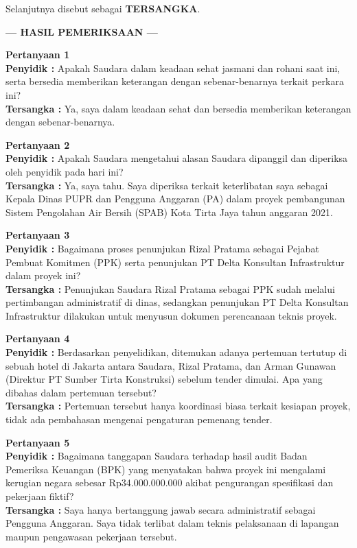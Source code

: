 \documentclass[12pt,a4paper]{article}
\begin{document}
Selanjutnya disebut sebagai \textbf{TERSANGKA}.

\vspace{0.3cm}
\begin{center}
    \textbf{--- HASIL PEMERIKSAAN ---}
\end{center}

\textbf{Pertanyaan 1} \\
\textbf{Penyidik :} Apakah Saudara dalam keadaan sehat jasmani dan rohani saat ini, serta bersedia memberikan keterangan dengan sebenar-benarnya terkait perkara ini? \\
\textbf{Tersangka :} Ya, saya dalam keadaan sehat dan bersedia memberikan keterangan dengan sebenar-benarnya.

\vspace{0.2cm}
\textbf{Pertanyaan 2} \\
\textbf{Penyidik :} Apakah Saudara mengetahui alasan Saudara dipanggil dan diperiksa oleh penyidik pada hari ini? \\
\textbf{Tersangka :} Ya, saya tahu. Saya diperiksa terkait keterlibatan saya sebagai Kepala Dinas PUPR dan Pengguna Anggaran (PA) dalam proyek pembangunan Sistem Pengolahan Air Bersih (SPAB) Kota Tirta Jaya tahun anggaran 2021.

\vspace{0.2cm}
\textbf{Pertanyaan 3} \\
\textbf{Penyidik :} Bagaimana proses penunjukan Rizal Pratama sebagai Pejabat Pembuat Komitmen (PPK) serta penunjukan PT Delta Konsultan Infrastruktur dalam proyek ini? \\
\textbf{Tersangka :} Penunjukan Saudara Rizal Pratama sebagai PPK sudah melalui pertimbangan administratif di dinas, sedangkan penunjukan PT Delta Konsultan Infrastruktur dilakukan untuk menyusun dokumen perencanaan teknis proyek.

\vspace{0.2cm}
\textbf{Pertanyaan 4} \\
\textbf{Penyidik :} Berdasarkan penyelidikan, ditemukan adanya pertemuan tertutup di sebuah hotel di Jakarta antara Saudara, Rizal Pratama, dan Arman Gunawan (Direktur PT Sumber Tirta Konstruksi) sebelum tender dimulai. Apa yang dibahas dalam pertemuan tersebut? \\
\textbf{Tersangka :} Pertemuan tersebut hanya koordinasi biasa terkait kesiapan proyek, tidak ada pembahasan mengenai pengaturan pemenang tender.

\vspace{0.2cm}
\textbf{Pertanyaan 5} \\
\textbf{Penyidik :} Bagaimana tanggapan Saudara terhadap hasil audit Badan Pemeriksa Keuangan (BPK) yang menyatakan bahwa proyek ini mengalami kerugian negara sebesar Rp34.000.000.000 akibat pengurangan spesifikasi dan pekerjaan fiktif? \\
\textbf{Tersangka :} Saya hanya bertanggung jawab secara administratif sebagai Pengguna Anggaran. Saya tidak terlibat dalam teknis pelaksanaan di lapangan maupun pengawasan pekerjaan tersebut.
\end{document}
